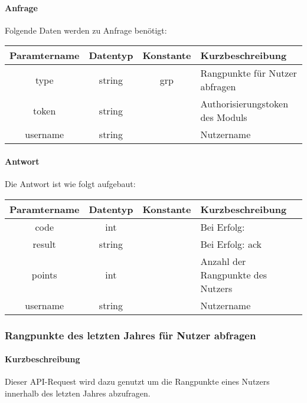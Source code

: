 \paragraph{Anfrage}Folgende Daten werden zu Anfrage benötigt:
\begin{table}[H]
	\begin{tabular}{|c|c|c|p{6.5cm}|}
		\hline
		\textbf{Paramtername} & \textbf{Datentyp} & \textbf{Konstante} & \textbf{Kurzbeschreibung}                                                                                               \\ \hline
		type                & string            & grp                & Rangpunkte für Nutzer abfragen \\ \hline
		token               & string            &                    & Authorisierungstoken des Moduls \\ \hline
		username            & string            &                    & Nutzername \\ \hline
	\end{tabular}
\end{table}
\paragraph{Antwort}Die Antwort ist wie folgt aufgebaut:
\begin{table}[H]
	\begin{tabular}{|c|c|c|p{6.5cm}|}
		\hline
		\textbf{Paramtername} & \textbf{Datentyp} & \textbf{Konstante} & \textbf{Kurzbeschreibung}            \\ \hline                
		code                & int              &                 & Bei Erfolg: {\glqq 0\grqq} \\ \hline
		result              & string           &                 & Bei Erfolg: {\glqq ack\grqq} \\ \hline
		points              & int              &                 & Anzahl der Rangpunkte des Nutzers \\ \hline
		username            & string           &                 & Nutzername \\ \hline
	\end{tabular}
\end{table}
\subsubsection{Rangpunkte des letzten Jahres für Nutzer abfragen}
\paragraph{Kurzbeschreibung}Dieser API-Request wird dazu genutzt um die Rangpunkte eines Nutzers innerhalb des letzten Jahres abzufragen.

